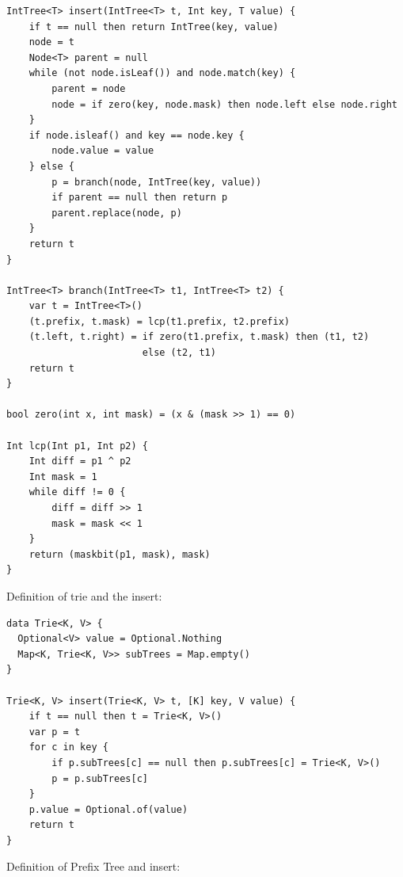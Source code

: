 \documentclass[b5paper]{article}
\begin{document}
\begin{lstlisting}[language = Bourbaki]
IntTree<T> insert(IntTree<T> t, Int key, T value) {
    if t == null then return IntTree(key, value)
    node = t
    Node<T> parent = null
    while (not node.isLeaf()) and node.match(key) {
        parent = node
        node = if zero(key, node.mask) then node.left else node.right
    }
    if node.isleaf() and key == node.key {
        node.value = value
    } else {
        p = branch(node, IntTree(key, value))
        if parent == null then return p
        parent.replace(node, p)
    }
    return t
}

IntTree<T> branch(IntTree<T> t1, IntTree<T> t2) {
    var t = IntTree<T>()
    (t.prefix, t.mask) = lcp(t1.prefix, t2.prefix)
    (t.left, t.right) = if zero(t1.prefix, t.mask) then (t1, t2)
                        else (t2, t1)
    return t
}

bool zero(int x, int mask) = (x & (mask >> 1) == 0)

Int lcp(Int p1, Int p2) {
    Int diff = p1 ^ p2
    Int mask = 1
    while diff != 0 {
        diff = diff >> 1
        mask = mask << 1
    }
    return (maskbit(p1, mask), mask)
}
\end{lstlisting}


Definition of trie and the insert:

\begin{lstlisting}[language = Bourbaki]
data Trie<K, V> {
  Optional<V> value = Optional.Nothing
  Map<K, Trie<K, V>> subTrees = Map.empty()
}

Trie<K, V> insert(Trie<K, V> t, [K] key, V value) {
    if t == null then t = Trie<K, V>()
    var p = t
    for c in key {
        if p.subTrees[c] == null then p.subTrees[c] = Trie<K, V>()
        p = p.subTrees[c]
    }
    p.value = Optional.of(value)
    return t
}
\end{lstlisting}

Definition of Prefix Tree and insert:
\end{document}
